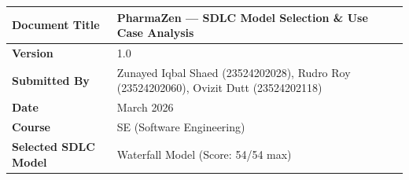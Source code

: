 \documentclass[12pt, a4paper]{article}
\begin{document}
\renewcommand{\arraystretch}{1.5}
\begin{tabular}{|L{3.8cm}|L{11.2cm}|}
  \hline
  \textbf{\small\color{darkgreen}Document Title} & \small PharmaZen --- SDLC Model Selection \& Use Case Analysis \\
  \hline
  \textbf{\small\color{darkgreen}Version} & \small 1.0 \\
  \hline
  \textbf{\small\color{darkgreen}Submitted By} & \small Zunayed Iqbal Shaed (23524202028), Rudro Roy (23524202060), Ovizit Dutt (23524202118) \\
  \hline
  \textbf{\small\color{darkgreen}Date} & \small March 2026 \\
  \hline
  \textbf{\small\color{darkgreen}Course} & \small SE (Software Engineering) \\
  \hline
  \textbf{\small\color{darkgreen}Selected SDLC Model} & \small Waterfall Model (Score: 54/54 max) \\
  \hline
\end{tabular}
\end{document}
